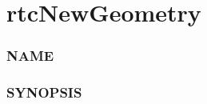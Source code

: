 \pagebreak

\section{rtcNewGeometry}\label{rtcnewgeometry}

\subsubsection{NAME}\label{name}

\begin{Shaded}
\begin{Highlighting}[]
\OperatorTok{{-}}
\end{Highlighting}
\end{Shaded}

\subsubsection{SYNOPSIS}\label{synopsis}

